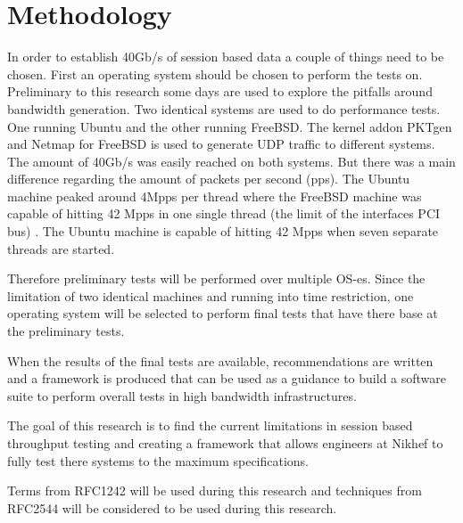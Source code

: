 \section{Methodology}
In order to establish 40Gb/s of session based data a couple of things need to be chosen.
First an operating system should be chosen to perform the tests on. Preliminary to this research some days are used to explore the pitfalls around bandwidth generation. Two identical systems are used to do performance tests.
One running Ubuntu and the other running FreeBSD. 
The kernel addon PKTgen and Netmap for FreeBSD is used to generate UDP traffic to different systems. The amount of 40Gb/s was easily reached on both systems.
But there was a main difference regarding the amount of packets per second (pps). The Ubuntu machine peaked around 4Mpps per thread where the FreeBSD machine was capable of hitting 42 Mpps in one single thread (the limit of the interfaces PCI bus) \cite{chelsio}.
The Ubuntu machine is capable of hitting 42 Mpps when seven separate threads are started. 

Therefore preliminary tests will be performed over multiple OS-es. Since the limitation of two identical machines and running into time restriction, one operating system will be selected to perform final tests that have there base at the preliminary tests.

When the results of the final tests are available, recommendations are written and a framework is produced that can be used as a guidance to build a software suite to perform overall tests in high bandwidth infrastructures.

The goal of this research is to find the current limitations in session based throughput testing and creating a framework that allows engineers at Nikhef to fully test there systems to the maximum specifications.

Terms from RFC1242 \cite{rfc1242} will be used during this research and techniques from RFC2544 \cite{rfc2544} will be considered to be used during this research. 
